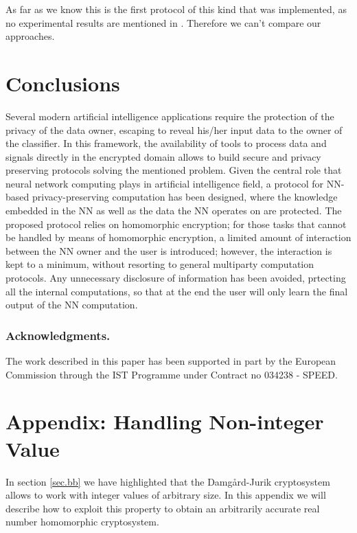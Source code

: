 \documentclass[11pt,oribibl,runningheads]{llncs}
\begin{document}
As far as we know this is the first protocol of this kind that was implemented, as no experimental results are mentioned in \cite{chang2005ope}. Therefore we can't compare our approaches.

\section{Conclusions}
\label{sec:conclusion}

Several modern artificial intelligence applications require the
protection of the privacy of the data owner, escaping to reveal
his/her input data to the owner of the classifier. In this
framework, the availability of tools to process data and signals
directly in the encrypted domain allows to build secure and
privacy preserving protocols solving the mentioned problem. Given
the central role that neural network computing plays in artificial
intelligence field, a protocol for NN-based privacy-preserving
computation has been designed, where the knowledge embedded in the
NN as well as the data the NN operates on are protected. The
proposed protocol relies on homomorphic encryption; for those
tasks that cannot be handled by means of homomorphic encryption,
a limited amount of interaction between the NN owner and the user
is introduced; however, the interaction is kept to a minimum,
without resorting to general multiparty computation protocols. Any
unnecessary disclosure of information has been avoided,
prtecting all the internal computations, so that at the
end the user will only learn the final output of the NN
computation.

\subsubsection*{Acknowledgments.}The work described in this paper has been supported in part by the
European Commission through the IST Programme under Contract no
034238 - SPEED.



\section*{Appendix: Handling Non-integer Value}
\label{appendix} In section \ref{sec.bb} we have highlighted that
the Damg{\aa}rd-Jurik cryptosystem allows to work with integer
values of arbitrary size. In this appendix we will describe how to
exploit this property to obtain an arbitrarily accurate real
number homomorphic cryptosystem.
\end{document}
